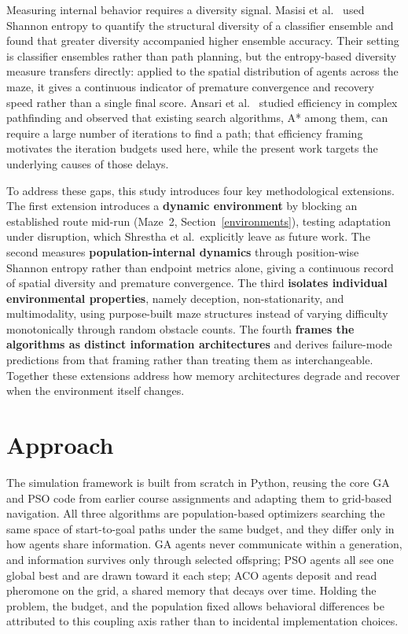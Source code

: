 \documentclass[11pt,a4paper]{article}
\begin{document}
    Measuring internal behavior requires a diversity signal. Masisi et al.~\cite{masisi2008} used Shannon entropy to quantify the structural diversity of a classifier ensemble and found that greater diversity accompanied higher ensemble accuracy. Their setting is classifier ensembles rather than path planning, but the entropy-based diversity measure transfers directly: applied to the spatial distribution of agents across the maze, it gives a continuous indicator of premature convergence and recovery speed rather than a single final score. Ansari et al.~\cite{ansari2015} studied efficiency in complex pathfinding and observed that existing search algorithms, A* among them, can require a large number of iterations to find a path; that efficiency framing motivates the iteration budgets used here, while the present work targets the underlying causes of those delays.

    To address these gaps, this study introduces four key methodological extensions. The first extension introduces a \textbf{dynamic environment} by blocking an established route mid-run (Maze~2, Section~\ref{environments}), testing adaptation under disruption, which Shrestha et al.\ explicitly leave as future work. The second measures \textbf{population-internal dynamics} through position-wise Shannon entropy rather than endpoint metrics alone, giving a continuous record of spatial diversity and premature convergence. The third \textbf{isolates individual environmental properties}, namely deception, non-stationarity, and multimodality, using purpose-built maze structures instead of varying difficulty monotonically through random obstacle counts. The fourth \textbf{frames the algorithms as distinct information architectures} and derives failure-mode predictions from that framing rather than treating them as interchangeable. Together these extensions address how memory architectures degrade and recover when the environment itself changes.

    \section{Approach}
    The simulation framework is built from scratch in Python, reusing the core GA and PSO code from earlier course assignments and adapting them to grid-based navigation. All three algorithms are population-based optimizers searching the same space of start-to-goal paths under the same budget, and they differ only in how agents share information. GA agents never communicate within a generation, and information survives only through selected offspring; PSO agents all see one global best and are drawn toward it each step; ACO agents deposit and read pheromone on the grid, a shared memory that decays over time. Holding the problem, the budget, and the population fixed allows behavioral differences be attributed to this coupling axis rather than to incidental implementation choices.
\end{document}
